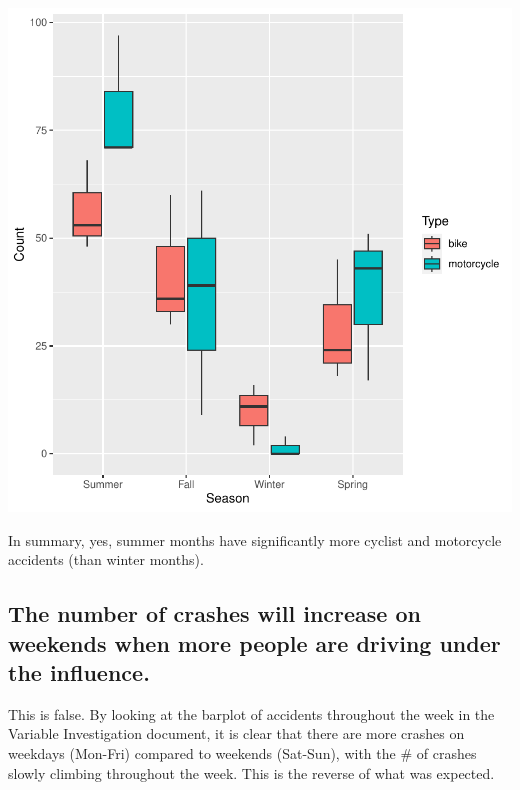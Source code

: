 \documentclass[11pt, a4paper]{article}
\begin{document}
\includegraphics{regression-047}

In summary, yes, summer months have significantly more cyclist and motorcycle accidents (than winter months). 




\pagebreak
\subsection{The number of crashes will increase on weekends when more people are driving under the influence.} 

This is false. By looking at the barplot of accidents throughout the week in the Variable Investigation document, it is clear that there are more crashes on weekdays (Mon-Fri) compared to weekends (Sat-Sun), with the \# of crashes slowly climbing throughout the week. This is the reverse of what was expected. 
\end{document}

